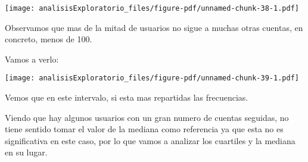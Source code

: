 \documentclass[
  letterpaper,
  DIV=11,
  numbers=noendperiod]{scrreprt}
\newenvironment{Shaded}{\begin{snugshade}}{\end{snugshade}}
\newcommand{\AttributeTok}[1]{\textcolor[rgb]{0.40,0.45,0.13}{#1}}
\newcommand{\DecValTok}[1]{\textcolor[rgb]{0.68,0.00,0.00}{#1}}
\newcommand{\FunctionTok}[1]{\textcolor[rgb]{0.28,0.35,0.67}{#1}}
\newcommand{\NormalTok}[1]{\textcolor[rgb]{0.00,0.23,0.31}{#1}}
\newcommand{\OtherTok}[1]{\textcolor[rgb]{0.00,0.23,0.31}{#1}}
\newcommand{\SpecialCharTok}[1]{\textcolor[rgb]{0.37,0.37,0.37}{#1}}
\newcommand{\StringTok}[1]{\textcolor[rgb]{0.13,0.47,0.30}{#1}}
\begin{document}
\begin{Shaded}
\end{Shaded}

\texttt{[image: analisisExploratorio\_files/figure-pdf/unnamed-chunk-38-1.pdf]}

Observamos que mas de la mitad de usuarios no sigue a muchas otras
cuentas, en concreto, menos de 100.

Vamos a verlo:

\begin{Shaded}
\end{Shaded}

\texttt{[image: analisisExploratorio\_files/figure-pdf/unnamed-chunk-39-1.pdf]}

Vemos que en este intervalo, si esta mas repartidas las frecuencias.

Viendo que hay algunos usuarios con un gran numero de cuentas seguidas,
no tiene sentido tomar el valor de la mediana como referencia ya que
esta no es significativa en este caso, por lo que vamos a analizar los
cuartiles y la mediana en su lugar.
\end{document}
